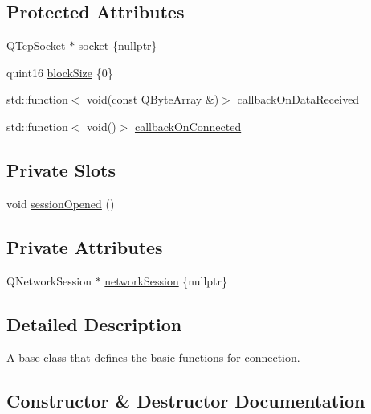 \subsection*{Protected Attributes}
\begin{DoxyCompactItemize}
\item 
Q\+Tcp\+Socket $\ast$ \hyperlink{classMODEL_1_1Connection_a0558920c8ed7149d80c3051117c2d60f}{socket} \{nullptr\}
\item 
quint16 \hyperlink{classMODEL_1_1Connection_a71471e77e7dd9a903dbd82687ca5c91c}{block\+Size} \{0\}
\item 
std\+::function$<$ void(const Q\+Byte\+Array \&)$>$ \hyperlink{classMODEL_1_1Connection_aa0b44072225e1b07b646bd973719ac80}{callback\+On\+Data\+Received}
\item 
std\+::function$<$ void()$>$ \hyperlink{classMODEL_1_1Connection_a0cb35149e127dbce2a09f0ac5d5cfc16}{callback\+On\+Connected}
\end{DoxyCompactItemize}
\subsection*{Private Slots}
\begin{DoxyCompactItemize}
\item 
void \hyperlink{classMODEL_1_1Connection_a29259cebd0636f7f03aafe1810b46e02}{session\+Opened} ()
\end{DoxyCompactItemize}
\subsection*{Private Attributes}
\begin{DoxyCompactItemize}
\item 
Q\+Network\+Session $\ast$ \hyperlink{classMODEL_1_1Connection_a24862c1b1d3d8d16843535cf9ec65dc2}{network\+Session} \{nullptr\}
\end{DoxyCompactItemize}


\subsection{Detailed Description}
A base class that defines the basic functions for connection. 

\subsection{Constructor \& Destructor Documentation}
